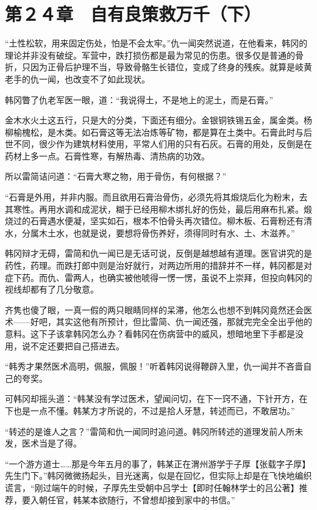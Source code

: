 \section{第２４章　自有良策救万千（下）}

“土性松软，用来固定伤处，怕是不会太牢。”仇一闻突然说道，在他看来，韩冈的理论并非没有破绽。军营中，跌打损伤都是最为常见的伤患。很多仅是普通的骨折，只因为正骨后护理不当，导致骨骼生长错位，变成了终身的残疾。就算是岐黄老手的仇一闻，也改变不了如此现状。

韩冈瞥了仇老军医一眼，道：“我说得土，不是地上的泥土，而是石膏。”

金木水火土这五行，只是大的分类，下面还有细分。金银铜铁锡五金，属金类。杨柳榆槐松，是木类。如石膏这等无法冶炼等矿物，都是算在土类中。石膏此时与后世不同，很少作为建筑材料使用，平常人们用的只有石灰。石膏的用处，反倒是在药材上多一点。石膏性寒，有解热毒、清热病的功效。

所以雷简诘问道：“石膏大寒之物，用于骨伤，有何根据？”

“石膏是外用，并非内服。而且欲用石膏治骨伤，必须先将其煅烧后化为粉末，去其寒性。再用水调和成泥状，糊于已经用柳木绑扎好的伤处，最后用麻布扎紧。煅烧过的石膏遇水便凝，坚实如石，根本不怕骨头再次错位。柳木板、石膏粉还有清水，分属木土水，也就是说，要想将骨伤养好，须得同时有水、土、木滋养。”

韩冈辩才无碍，雷简和仇一闻已是无话可说，反倒是越想越有道理。医官讲究的是药性，药理。而跌打郎中则是治好就行，对两边所用的措辞并不一样，韩冈都是对症下药。而仇、雷两人，也确实被他唬得一愣一愣，虽说不上崇拜，但投向韩冈的视线却都有了几分敬意。

齐隽也傻了眼，一真一假的两只眼睛同样的呆滞，他怎么也想不到韩冈竟然还会医术——好吧，其实这他有所预计，但比雷简、仇一闻还强，那就完完全全出乎他的意料。这下子该拿韩冈怎么办？看韩冈在伤病营中的威风，想暗地里下手都是没用，说不定还要把自己搭进去。

“韩秀才果然医术高明，佩服，佩服！”听着韩冈说得鞭辟入里，仇一闻并不吝啬自己的夸奖。

可韩冈却摇头道：“韩某没有学过医术，望闻问切，在下一窍不通，下针开方，在下也是一点不懂。韩某方才所说的，不过是拾人牙慧，转述而已，不敢居功。”

“转述的是谁人之言？”雷简和仇一闻同时追问道。韩冈所转述的道理发前人所未发，医术当是了得。

“一个游方道士……那是今年五月的事了，韩某正在渭州游学于子厚【张载字子厚】先生门下。”韩冈微微扬起头，目光迷离，似是在回忆，但实际上却是在飞快地编织谎言，“刚过端午的时候，子厚先生受朝中吕学士【即时任翰林学士的吕公著】推荐，要入朝任官，韩某本欲随行，不曾想却接到家中的书信。”

